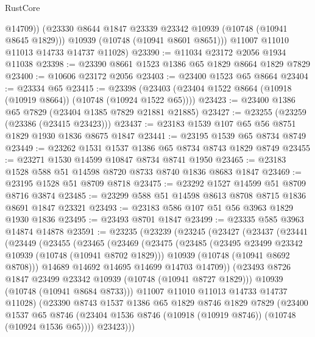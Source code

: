 \begin{lexlean}{RustCore}
\begin{coremodule}
            @14709))
        (@23330 @8644 @1847 @23339 @23342 @10939 (@10748 (@10941 @8645 @1829)))
        @10939
        (@10748 (@10941 @8601 @8651)))
      @11007
      @11010
      @11013
      @14733
      @14737
      @11028)
@23390 := @11034 @23172 @2056 @1934 @11038
@23398 := @23390 @8661 @1523 @1386 @65 @1829 @8664 @1829 @7829
@23400 := @10606 @23172 @2056
@23403 := @23400 @1523 @65 @8664
@23404 := @23334 @65
@23415 := @23398 (@23403 (@23404 @1522 @8664 (@10918 (@10919 @8664)) (@10748 (@10924 @1522 @65))))
@23423 := @23400 @1386 @65 @7829 (@23404 @1385 @7829 @21881 @21885)
@23427 := @23255 (@23259 (@23386 (@23415 @23423)))
@23437 := @23183 @1539 @107 @65 @56 @8751 @1829 @1930 @1836 @8675 @1847
@23441 := @23195 @1539 @65 @8734 @8749
@23449 := @23262 @1531 @1537 @1386 @65 @8734 @8743 @1829 @8749
@23455 := @23271 @1530 @14599 @10847 @8734 @8741 @1950
@23465 := @23183 @1528 @588 @51 @14598 @8720 @8733 @8740 @1836 @8683 @1847
@23469 := @23195 @1528 @51 @8709 @8718
@23475 := @23292 @1527 @14599 @51 @8709 @8716 @3874
@23485 := @23299 @588 @51 @14598 @8613 @8708 @8715 @1836 @8691 @1847 @23321
@23493 := @23183 @586 @107 @51 @56 @3963 @1829 @1930 @1836
@23495 := @23493 @8701 @1847
@23499 := @23335 @585 @3963 @14874 @14878
@23591 := @23235
    (@23239
      (@23245
        (@23427
          (@23437
            (@23441
              (@23449
                (@23455
                  (@23465
                    (@23469
                      (@23475
                        (@23485
                          (@23495 @23499 @23342 @10939 (@10748 (@10941 @8702 @1829)))
                          @10939
                          (@10748 (@10941 @8692 @8708)))
                        @14689
                        @14692
                        @14695
                        @14699
                        @14703
                        @14709))
                    (@23493 @8726 @1847 @23499 @23342 @10939 (@10748 (@10941 @8727 @1829)))
                    @10939
                    (@10748 (@10941 @8684 @8733)))
                  @11007
                  @11010
                  @11013
                  @14733
                  @14737
                  @11028)
                (@23390
                  @8743
                  @1537
                  @1386
                  @65
                  @1829
                  @8746
                  @1829
                  @7829
                  (@23400
                    @1537
                    @65
                    @8746
                    (@23404 @1536 @8746 (@10918 (@10919 @8746)) (@10748 (@10924 @1536 @65))))
                  @23423)))

\end{coremodule}
\end{lexlean}
